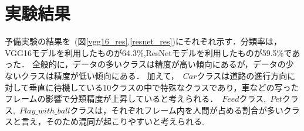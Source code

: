 \section{実験結果}
予備実験の結果を~(図\ref{vgg16_res},\ref{resnet_res})にそれぞれ示す．分類率は，VGG16モデルを利用したものが64.3\%,ResNetモデルを利用したものが59.5\%であった．
全般的に，データの多いクラスは精度が高い傾向にあるが，データの少ないクラスは精度が低い傾向にある．
加えて，~\(Car\)クラスは道路の進行方向に対して垂直に待機している10クラスの中で特殊なクラスであり，車などの写ったフレームの影響で分類精度が上昇していると考えられる．~\(Feed\)クラス,~\(Pet\)クラス,~\(Play\_with\_ball\)クラスは，それぞれフレーム内を人間が占める割合が多いクラスと言え，そのため混同が起こりやすいと考えられる.



